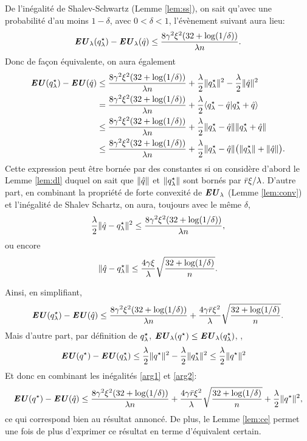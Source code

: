 De l'inégalité de Shalev-Schwartz (Lemme \ref{lem:ss}), on sait qu'avec une probabilité
d'au moins $1-\delta$, avec $0<\delta<1$, l'évènement suivant aura lieu:
\begin{equation}
  \operatorname{\mbox{\textbf{\textit{EU}}}}_\lambda(q^\star_\lambda) - \operatorname{\mbox{\textbf{\textit{EU}}}}_\lambda(\hat q) \leq \frac{8\gamma^2\xi^2(32+\log(1/\delta))}{\lambda n}.
\end{equation}
Donc de façon équivalente, on aura également
\begin{align}
  \operatorname{\mbox{\textbf{\textit{EU}}}}(q^\star_\lambda) - \operatorname{\mbox{\textbf{\textit{EU}}}}(\hat q) &\leq \frac{8\gamma^2\xi^2(32+\log(1/\delta))}{\lambda n} + \frac{\lambda}{2}\|q^\star_\lambda\|^2 -
                         \frac{\lambda}{2}\|\hat q\|^2\\
                       &= \frac{8\gamma^2\xi^2(32+\log(1/\delta))}{\lambda n} + \frac{\lambda}{2}\langle q^\star_\lambda - \hat q |
                         q^\star_\lambda + \hat q\rangle\\
                       &\leq \frac{8\gamma^2\xi^2(32+\log(1/\delta))}{\lambda n} +
                         \frac{\lambda}{2}\|q^\star_\lambda - \hat q\|\|q^\star_\lambda + \hat q\|\\
                       &\leq \frac{8\gamma^2\xi^2(32+\log(1/\delta))}{\lambda n} + \frac{\lambda}{2}\|q^\star_\lambda -
                         \hat q\|\big(\|q^\star_\lambda\| + \|\hat q\|\big).
\end{align}
Cette expression peut être bornée par des constantes si on considère d'abord le Lemme
\ref{lem:dl} duquel on sait que $\|\hat q\|$ et $\|q^\star_\lambda\|$ sont bornés par
$\bar r\xi/\lambda$. D'autre part, en combinant la propriété de forte convexité de
$\operatorname{\mbox{\textbf{\textit{EU}}}}_\lambda$ (Lemme \ref{lem:conv}) et l'inégalité de Shalev Schartz, on aura, toujours avec le
même $\delta$,
\begin{equation}
  \frac{\lambda}{2}\|\hat q - q^\star_\lambda\|^2 \leq \frac{8\gamma^2\xi^2(32+\log(1/\delta))}{\lambda n},
\end{equation}
ou encore
\begin{equation}
  \|\hat q - q^\star_\lambda\| \leq \frac{4\gamma\xi}{\lambda}\sqrt\frac{32+\log(1/\delta)}{n}.
\end{equation}

Ainsi, en simplifiant, 
\begin{equation}
  \label{arg1}
  \operatorname{\mbox{\textbf{\textit{EU}}}}(q^\star_\lambda) - \operatorname{\mbox{\textbf{\textit{EU}}}}(\hat q) \leq \frac{8\gamma^2\xi^2(32+\log(1/\delta))}{\lambda n} +
  \frac{4\gamma\bar r\xi^2}{\lambda}\sqrt\frac{32+\log(1/\delta)}{n}.
\end{equation}
Mais d'autre part, par définition de $q^\star_\lambda$, $\operatorname{\mbox{\textbf{\textit{EU}}}}_\lambda(q^\star) \leq \operatorname{\mbox{\textbf{\textit{EU}}}}_\lambda(q^\star_\lambda)$, \ie,
\begin{align}
  \label{arg2}
  \operatorname{\mbox{\textbf{\textit{EU}}}}(q^\star) - \operatorname{\mbox{\textbf{\textit{EU}}}}(q^\star_\lambda) &\leq \frac{\lambda}{2}\|q^\star\|^2 - \frac{\lambda}{2}\|q^\star_\lambda\|^2 \leq \frac{\lambda}{2}\|q^\star\|^2
\end{align}
Et donc en combinant les inégalités \eqref{arg1} et \eqref{arg2}:
\begin{equation}
  \operatorname{\mbox{\textbf{\textit{EU}}}}(q^\star) - \operatorname{\mbox{\textbf{\textit{EU}}}}(\hat q) \leq \frac{8\gamma^2\xi^2(32+\log(1/\delta))}{\lambda n} +
  \frac{4\gamma\bar r\xi^2}{\lambda}\sqrt\frac{32+\log(1/\delta)}{n} + \frac{\lambda}{2}\|q^\star\|^2,
\end{equation}
ce qui correspond bien au résultat annoncé. De plus, le Lemme \ref{lem:ce} permet une fois
de plus d'exprimer ce résultat en terme d'équivalent certain.




